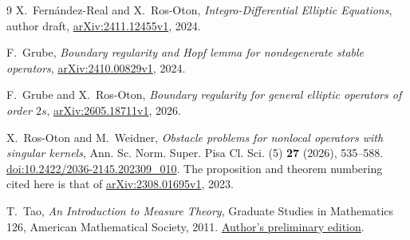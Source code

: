 \documentclass[11pt]{article}
\numberwithin{equation}{section}
\theoremstyle{remark}
\begin{document}
\begin{thebibliography}{9}
X.~Fern\'andez-Real and X.~Ros-Oton,
\emph{Integro-Differential Elliptic Equations}, author draft,
\href{https://arxiv.org/abs/2411.12455v1}{arXiv:2411.12455v1}, 2024.

F.~Grube,
\emph{Boundary regularity and Hopf lemma for nondegenerate stable operators},
\href{https://arxiv.org/abs/2410.00829v1}{arXiv:2410.00829v1}, 2024.

F.~Grube and X.~Ros-Oton,
\emph{Boundary regularity for general elliptic operators of order $2s$},
\href{https://arxiv.org/abs/2605.18711v1}{arXiv:2605.18711v1}, 2026.

X.~Ros-Oton and M.~Weidner,
\emph{Obstacle problems for nonlocal operators with singular kernels},
Ann. Sc. Norm. Super. Pisa Cl. Sci. (5) \textbf{27} (2026), 535--588.
\href{https://doi.org/10.2422/2036-2145.202309_010}{doi:10.2422/2036-2145.202309\_010}.
The proposition and theorem numbering cited here is that of
\href{https://arxiv.org/abs/2308.01695v1}{arXiv:2308.01695v1}, 2023.

T.~Tao,
\emph{An Introduction to Measure Theory}, Graduate Studies in Mathematics 126,
American Mathematical Society, 2011.
\href{https://terrytao.wordpress.com/books/an-introduction-to-measure-theory/}{Author's preliminary edition}.
\end{thebibliography}
\end{document}
